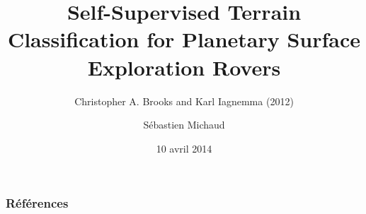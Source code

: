 \documentclass[14pt,t]{beamer}
\title[Self-Supervised Terrain Classification]{Self-Supervised Terrain Classification for Planetary Surface Exploration Rovers}
\subtitle{Christopher A. Brooks and Karl Iagnemma (2012)}
\author{Sébastien Michaud}
\institute{Université Laval}
\date{10 avril 2014}
\begin{document}
\begin{frame}
    \titlepage
\end{frame} 
    

            




\begin{frame}[allowframebreaks]
    \frametitle{Références}
    \small
    \nocite{*}
    
    
\end{frame}
\end{document}
